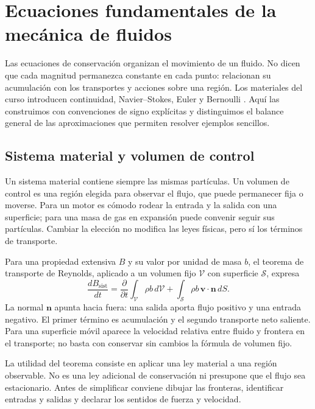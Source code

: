 \chapter{Ecuaciones fundamentales de la mecánica de fluidos}\label{ch:07}

Las ecuaciones de conservación organizan el movimiento de un fluido. No dicen que cada magnitud permanezca constante en cada punto: relacionan su acumulación con los transportes y acciones sobre una región. Los materiales del curso introducen continuidad, Navier--Stokes, Euler y Bernoulli \cite{TAE3}. Aquí las construimos con convenciones de signo explícitas y distinguimos el balance general de las aproximaciones que permiten resolver ejemplos sencillos.

\section{Sistema material y volumen de control}
Un sistema material contiene siempre las mismas partículas. Un volumen de control es una región elegida para observar el flujo, que puede permanecer fija o moverse. Para un motor es cómodo rodear la entrada y la salida con una superficie; para una masa de gas en expansión puede convenir seguir sus partículas. Cambiar la elección no modifica las leyes físicas, pero sí los términos de transporte.

Para una propiedad extensiva $B$ y su valor por unidad de masa $b$, el teorema de transporte de Reynolds, aplicado a un volumen fijo $\mathcal V$ con superficie $\mathcal S$, expresa
\begin{equation}\label{eq:07-RTT}
 \frac{dB_{\mathrm{sist}}}{dt}=
 \frac{\partial}{\partial t}\int_{\mathcal V}\rho b\,d\mathcal V+
 \int_{\mathcal S}\rho b\,\boldsymbol{v}\cdot\boldsymbol{n}\,dS.
\end{equation}
La normal $\boldsymbol{n}$ apunta hacia fuera: una salida aporta flujo positivo y una entrada negativo. El primer término es acumulación y el segundo transporte neto saliente. Para una superficie móvil aparece la velocidad relativa entre fluido y frontera en el transporte; no basta con conservar sin cambios la fórmula de volumen fijo.

La utilidad del teorema consiste en aplicar una ley material a una región observable. No es una ley adicional de conservación ni presupone que el flujo sea estacionario. Antes de simplificar conviene dibujar las fronteras, identificar entradas y salidas y declarar los sentidos de fuerza y velocidad.

